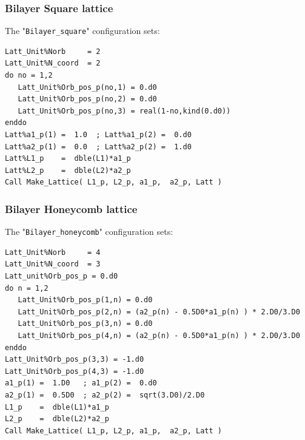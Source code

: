 \subsubsection{Bilayer Square lattice}
The "\texttt{Bilayer\_square}"   configuration sets:
\begin{lstlisting}[style=fortran]
Latt_Unit%Norb     = 2
Latt_Unit%N_coord  = 2
do no = 1,2
   Latt_Unit%Orb_pos_p(no,1) = 0.d0 
   Latt_Unit%Orb_pos_p(no,2) = 0.d0 
   Latt_Unit%Orb_pos_p(no,3) = real(1-no,kind(0.d0))
enddo
Latt%a1_p(1) =  1.0  ; Latt%a1_p(2) =  0.d0
Latt%a2_p(1) =  0.0  ; Latt%a2_p(2) =  1.d0
Latt%L1_p    =  dble(L1)*a1_p
Latt%L2_p    =  dble(L2)*a2_p
Call Make_Lattice( L1_p, L2_p, a1_p,  a2_p, Latt )
\end{lstlisting}


\subsubsection{Bilayer Honeycomb lattice}
The "\texttt{Bilayer\_honeycomb}"   configuration sets:
\begin{lstlisting}[style=fortran]
Latt_Unit%Norb     = 4
Latt_Unit%N_coord  = 3
Latt_unit%Orb_pos_p = 0.d0
do n = 1,2
   Latt_Unit%Orb_pos_p(1,n) = 0.d0 
   Latt_Unit%Orb_pos_p(2,n) = (a2_p(n) - 0.5D0*a1_p(n) ) * 2.D0/3.D0
   Latt_Unit%Orb_pos_p(3,n) = 0.d0 
   Latt_Unit%Orb_pos_p(4,n) = (a2_p(n) - 0.5D0*a1_p(n) ) * 2.D0/3.D0
enddo
Latt_Unit%Orb_pos_p(3,3) = -1.d0
Latt_Unit%Orb_pos_p(4,3) = -1.d0
a1_p(1) =  1.D0   ; a1_p(2) =  0.d0
a2_p(1) =  0.5D0  ; a2_p(2) =  sqrt(3.D0)/2.D0
L1_p    =  dble(L1)*a1_p
L2_p    =  dble(L2)*a2_p
Call Make_Lattice( L1_p, L2_p, a1_p,  a2_p, Latt )
\end{lstlisting}


